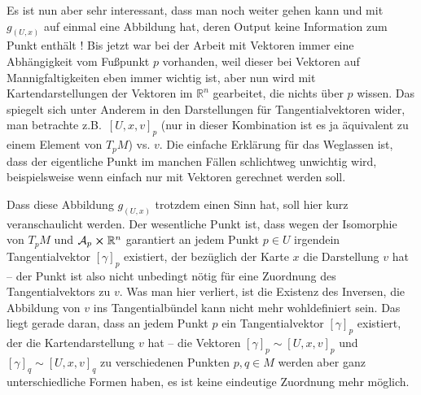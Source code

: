 \documentclass[../H_Analysis_main.tex]{subfiles}
\begin{document}
Es ist nun aber sehr interessant, dass man noch weiter gehen kann und mit $g_{(U, x)}$ auf einmal eine Abbildung hat, deren Output keine Information zum Punkt enthält ! Bis jetzt war bei der Arbeit mit Vektoren immer eine Abhängigkeit vom Fußpunkt $p$ vorhanden, weil dieser bei Vektoren auf Mannigfaltigkeiten eben immer wichtig ist, aber nun wird mit Kartendarstellungen der Vektoren im $\mathbb{R}^n$ gearbeitet, die nichts über $p$ wissen. Das spiegelt sich unter Anderem in den Darstellungen für Tangentialvektoren wider, man betrachte z.B.~$[U, x, v]_p$ (nur in dieser Kombination ist es ja äquivalent zu einem Element von $T_p M$) vs. $v$. Die einfache Erklärung für das Weglassen ist, dass der eigentliche Punkt im manchen Fällen schlichtweg unwichtig wird, beispielsweise wenn einfach nur mit Vektoren gerechnet werden soll.

Dass diese Abbildung $g_{(U, x)}$ trotzdem einen Sinn hat, soll hier kurz veranschaulicht werden. Der wesentliche Punkt ist, dass wegen der Isomorphie von $T_p M$ und $\mathcal{A}_p \cross \mathbb{R}^n$ garantiert an jedem Punkt $p \in U$ irgendein Tangentialvektor $[\gamma]_p$ existiert, der bezüglich der Karte $x$ die Darstellung $v$ hat -- der Punkt ist also nicht unbedingt nötig für eine Zuordnung des Tangentialvektors zu $v$. Was man hier verliert, ist die Existenz des Inversen, die Abbildung von $v$ ins Tangentialbündel kann nicht mehr wohldefiniert sein. Das liegt gerade daran, dass an jedem Punkt $p$ ein Tangentialvektor $[\gamma]_p$ existiert, der die Kartendarstellung $v$ hat -- die Vektoren $[\gamma]_p \sim [U, x, v]_p$ und $[\gamma]_q \sim [U, x, v]_q$ zu verschiedenen Punkten $p, q \in M$ werden aber ganz unterschiedliche Formen haben, es ist keine eindeutige Zuordnung mehr möglich.\\
\end{document}
